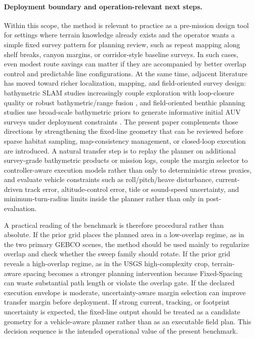 \documentclass[jmse,article,submit,moreauthors]{Definitions/mdpi}
\begin{document}
\paragraph{Deployment boundary and operation-relevant next steps.}
Within this scope, the method is relevant to practice as a pre-mission design tool for settings where terrain knowledge already exists and the operator wants a simple fixed survey pattern for planning review, such as repeat mapping along shelf breaks, canyon margins, or corridor-style baseline surveys. In such cases, even modest route savings can matter if they are accompanied by better overlap control and predictable line configurations. At the same time, adjacent literature has moved toward richer localization, mapping, and field-oriented survey design: bathymetric SLAM studies increasingly couple exploration with loop-closure quality or robust bathymetric/range fusion \cite{ling2023active,zhu2025robust}, and field-oriented benthic planning studies use broad-scale bathymetric priors to generate informative initial AUV surveys under deployment constraints \cite{shields2023feature}. The present paper complements those directions by strengthening the fixed-line geometry that can be reviewed before sparse habitat sampling, map-consistency management, or closed-loop execution are introduced. A natural transfer step is to replay the planner on additional survey-grade bathymetric products or mission logs, couple the margin selector to controller-aware execution models rather than only to deterministic stress proxies, and evaluate vehicle constraints such as roll/pitch/heave disturbance, current-driven track error, altitude-control error, tide or sound-speed uncertainty, and minimum-turn-radius limits inside the planner rather than only in post-evaluation.

A practical reading of the benchmark is therefore procedural rather than absolute. If the prior grid places the planned area in a low-overlap regime, as in the two primary GEBCO scenes, the method should be used mainly to regularize overlap and check whether the sweep family should rotate. If the prior grid reveals a high-overlap regime, as in the USGS high-complexity crop, terrain-aware spacing becomes a stronger planning intervention because Fixed-Spacing can waste substantial path length or violate the overlap gate. If the declared execution envelope is moderate, uncertainty-aware margin selection can improve transfer margin before deployment. If strong current, tracking, or footprint uncertainty is expected, the fixed-line output should be treated as a candidate geometry for a vehicle-aware planner rather than as an executable field plan. This decision sequence is the intended operational value of the present benchmark.
\end{document}
